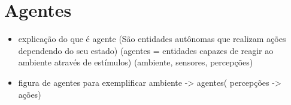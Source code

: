 \chapter{\label{chap:agentes}Agentes}

\begin{itemize}
	\item explicação do que é agente (São entidades autônomas que realizam ações dependendo do seu estado) (agentes = entidades capazes de reagir ao ambiente através de estímulos) (ambiente, sensores, percepções) 
	\item figura de agentes para exemplificar ambiente -> agentes( percepções -> ações) 	
\end{itemize}